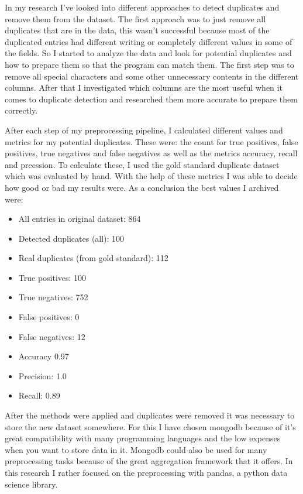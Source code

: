 \documentclass[conference]{IEEEtran}
\begin{document}
In my research I've looked into different approaches to detect duplicates and remove them from the dataset. The first approach was to just remove all duplicates that are in the data, this wasn't successful because most of the duplicated entries had different writing or completely different values in some of the fields. So I started to analyze the data and look for potential duplicates and how to prepare them so that the program can match them. The first step was to remove all special characters and some other unnecessary contents in the different columns. After that I investigated which columns are the most useful when it comes to duplicate detection and researched them more accurate to prepare them correctly. 

After each step of my preprocessing pipeline, I calculated different values and metrics for my potential duplicates. These were: the count for true positives, false positives, true negatives and false negatives as well as the metrics accuracy, recall and precssion. To calculate these, I used the gold standard duplicate dataset which was evaluated by hand. With the help of these metrics I was able to decide how good or bad my results were. As a conclusion the best values I archived were: 
\begin{itemize}
	\item All entries in original dataset: 864
	\item Detected duplicates (all): 100
	\item Real duplicates (from gold standard): 112
	\item True positives: 100
	\item True negatives: 752
	\item False positives: 0
	\item False negatives: 12
	\item Accuracy 0.97
	\item Precision: 1.0
	\item Recall: 0.89
\end{itemize}

After the methods were applied and duplicates were removed it was necessary to store the new dataset somewhere. For this I have chosen mongodb because of it's great compatibility with many programming languages and the low expenses when you want to store data in it. Mongodb could also be used for many preprocessing tasks because of the great aggregation framework that it offers. In this research I rather focused on the preprocessing with pandas, a python data science library.
\end{document}
